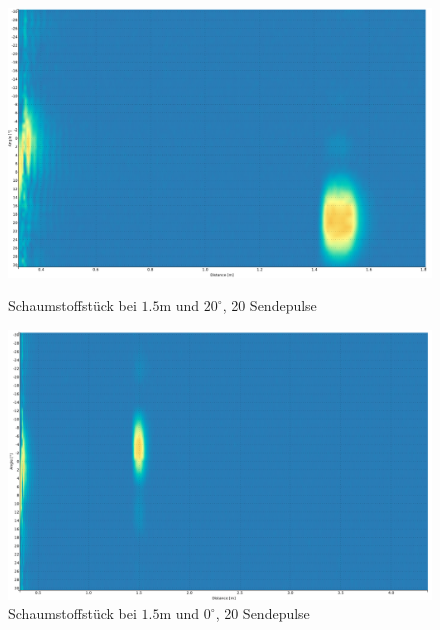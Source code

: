 \clearpage
\begin{figure}[htb]
\begin{minipage}{1.0\textwidth}
\includegraphics[width=\textwidth]{graphics/image_test_obj_schaumstoff_20deg_0.png}
\caption{Schaumstoffstück bei $1.5 \mathrm{m}$ und $20^{\circ}$, 20 Sendepulse} %
\label{fig:image_test_obj_schaumstoff_20deg_0}
%
\end{minipage}
\begin{minipage}{1.0\textwidth}
\includegraphics[width=\textwidth]{graphics/image_test_obj_schaumstoff_0deg.png}
\caption{Schaumstoffstück bei $1.5 \mathrm{m}$ und $0^{\circ}$, 20 Sendepulse} %
\label{fig:image_test_obj_schaumstoff_0deg}
%
\end{minipage}
\end{figure}


